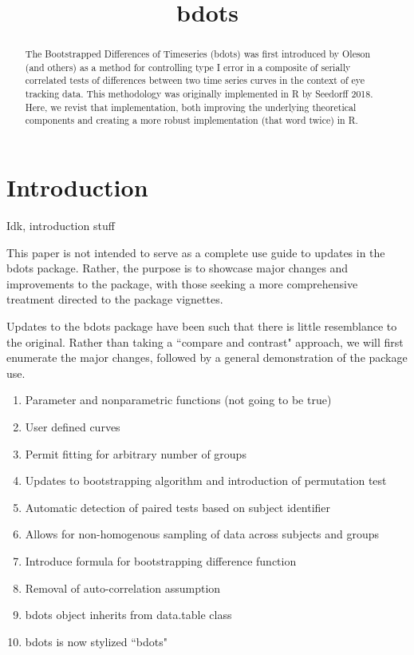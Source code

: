 \documentclass{article}
\title{bdots}
\date{}
\begin{document}

\maketitle

%

\begin{abstract}
The Bootstrapped Differences of Timeseries (bdots) was first introduced by Oleson (and others) as a method for controlling type I error in a composite of serially correlated tests of differences between two time series curves in the context of eye tracking data.  This methodology was originally implemented in R by Seedorff 2018. Here, we revist that implementation, both improving the underlying theoretical components and creating a more robust implementation (that word twice) in R. 
\end{abstract}

\section{Introduction}

Idk, introduction stuff

This paper is not intended to serve as a complete use guide to updates in the bdots package. Rather, the purpose is to showcase major changes and improvements to the package, with those seeking a more comprehensive treatment directed to the package vignettes. 

Updates to the bdots package have been such that there is little resemblance to the original. Rather than taking a ``compare and contrast" approach, we will first enumerate the major changes, followed by a general demonstration of the package use. 

\begin{enumerate}
\item Parameter and nonparametric functions (not going to be true)
\item User defined curves
\item Permit fitting for arbitrary number of groups
\item Updates to bootstrapping algorithm and introduction of permutation test
\item Automatic detection of paired tests based on subject identifier
\item Allows for non-homogenous sampling of data across subjects and groups
\item Introduce formula for bootstrapping difference function
\item Removal of auto-correlation assumption
\item bdots object inherits from data.table class
\item bdots is now stylized ``bdots"
\end{enumerate}
\end{document}
